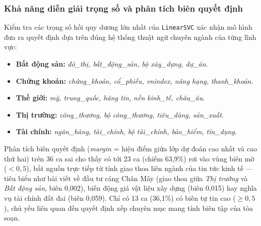 \subsubsection{Khả năng diễn giải trọng số và phân tích biên quyết định}
Kiểm tra các trọng số hồi quy dương lớn nhất của \texttt{LinearSVC} xác nhận mô hình đưa ra quyết định dựa trên đúng hệ thống thuật ngữ chuyên ngành của từng lĩnh vực:
\begin{itemize}[leftmargin=*]
  \item \textbf{Bất động sản:} \textit{đô\_thị, bất\_động\_sản, bộ xây\_dựng, dự\_án}.
  \item \textbf{Chứng khoán:} \textit{chứng\_khoán, cổ\_phiếu, vnindex, nâng hạng, thanh\_khoản}.
  \item \textbf{Thế giới:} \textit{mỹ, trung\_quốc, hãng tin, nền kinh\_tế, châu\_âu}.
  \item \textbf{Thị trường:} \textit{công\_thương, bộ công\_thương, tiêu\_dùng, sản\_xuất}.
  \item \textbf{Tài chính:} \textit{ngân\_hàng, tài\_chính, bộ tài\_chính, bảo\_hiểm, tín\_dụng}.
\end{itemize}

Phân tích biên quyết định (\textit{margin} = hiệu điểm giữa lớp dự đoán cao nhất và cao thứ hai) trên 36 ca sai cho thấy có tới 23 ca (chiếm 63,9\%) rơi vào vùng biên mờ ($< 0,5$), bắt nguồn trực tiếp từ tính giao thoa liên ngành của tin tức kinh tế — tiêu biểu như bài viết về đầu tư cảng Chân Mây (giao thoa giữa \textit{Thị trường} và \textit{Bất động sản}, biên 0,002), biến động giá vật liệu xây dựng (biên 0,015) hay nghĩa vụ tài chính đất đai (biên 0,059). Chỉ có 13 ca (36,1\%) có biên tự tin cao ($\ge 0,5$), chủ yếu liên quan đến quyết định xếp chuyên mục mang tính biên tập của tòa soạn.
